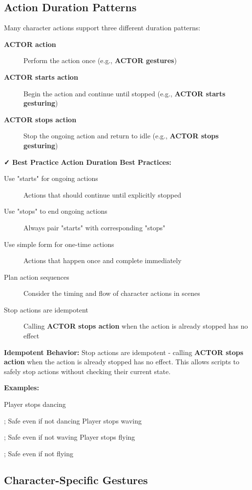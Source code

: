 \documentclass[11pt,letterpaper,oldstylefigures]{memoir}
\newcommand{\stagedir}[1]{#1\par\vspace{1\baselineskip}}
\newenvironment{FountainExample}
  {\begingroup
  \ttfamily\small
   \setlength{\parindent}{0pt}
  \setlength{\parskip}{0.5em}
  \allowdisplaybreaks
  \setlength{\displaywidowpenalty}{0}
  \setlength{\widowpenalty}{0}
  \setlength{\clubpenalty}{0}
  \setlength{\interlinepenalty}{0}
}
  {\endgroup}
\newcommand{\fountain}[1]{\textbf{#1}}
\begin{document}
\begin{FountainExample}
\subsection{Action Duration Patterns}

Many character actions support three different duration patterns:

\begin{description}
\item[\fountain{ACTOR action}] Perform the action once (e.g., \fountain{ACTOR gestures})
\item[\fountain{ACTOR starts action}] Begin the action and continue until stopped (e.g., \fountain{ACTOR starts gesturing})
\item[\fountain{ACTOR stops action}] Stop the ongoing action and return to idle (e.g., \fountain{ACTOR stops gesturing})
\end{description}

\textbf{✓ Best Practice}
\textbf{Action Duration Best Practices:}
\begin{description}
\item[Use "starts" for ongoing actions] Actions that should continue until explicitly stopped
\item[Use "stops" to end ongoing actions] Always pair "starts" with corresponding "stops"
\item[Use simple form for one-time actions] Actions that happen once and complete immediately
\item[Plan action sequences] Consider the timing and flow of character actions in scenes
\item[Stop actions are idempotent] Calling \fountain{ACTOR stops action} when the action is already stopped has no effect
\end{description}

\textbf{Idempotent Behavior:}
Stop actions are idempotent - calling \fountain{ACTOR stops action} when the action is already stopped has no effect. This allows scripts to safely stop actions without checking their current state.

\textbf{Examples:}
\begin{FountainExample}
\stagedir{Player stops dancing}   ; Safe even if not dancing
\stagedir{Player stops waving}    ; Safe even if not waving
\stagedir{Player stops flying}    ; Safe even if not flying
\end{FountainExample}

\subsection{Character-Specific Gestures}


\end{FountainExample}
\end{document}
